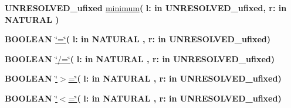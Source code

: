 \begin{DoxyCompactItemize}
\item 
{\bfseries {\bfseries \textcolor{vhdlchar}{U\+N\+R\+E\+S\+O\+L\+V\+E\+D\+\_\+ufixed}\textcolor{vhdlchar}{ }}} \hyperlink{class__fixed__pkg_ae6f8be7af801cf9cb3dcc7b877059955}{minimum}{\bfseries  ( }{\bfseries \textcolor{vhdlchar}{l\+: }\textcolor{stringliteral}{in }\textcolor{vhdlchar}{U\+N\+R\+E\+S\+O\+L\+V\+E\+D\+\_\+ufixed}}{\bfseries  , \textcolor{vhdlchar}{r\+: }\textcolor{stringliteral}{in }{\bfseries \textcolor{comment}{N\+A\+T\+U\+R\+A\+L}\textcolor{vhdlchar}{ }}}{\bfseries  )} 
\item 
{\bfseries {\bfseries \textcolor{comment}{B\+O\+O\+L\+E\+A\+N}\textcolor{vhdlchar}{ }}} \hyperlink{class__fixed__pkg_a7949e9258ea0749e3b35961feea8db87}{\char`\"{}=\char`\"{}}{\bfseries  ( }{\bfseries \textcolor{vhdlchar}{l\+: }\textcolor{stringliteral}{in }{\bfseries \textcolor{comment}{N\+A\+T\+U\+R\+A\+L}\textcolor{vhdlchar}{ }}}{\bfseries  , \textcolor{vhdlchar}{r\+: }\textcolor{stringliteral}{in }\textcolor{vhdlchar}{U\+N\+R\+E\+S\+O\+L\+V\+E\+D\+\_\+ufixed}}{\bfseries  )} 
\item 
{\bfseries {\bfseries \textcolor{comment}{B\+O\+O\+L\+E\+A\+N}\textcolor{vhdlchar}{ }}} \hyperlink{class__fixed__pkg_a00087aded97b434060226b9ba63a9077}{\char`\"{}/=\char`\"{}}{\bfseries  ( }{\bfseries \textcolor{vhdlchar}{l\+: }\textcolor{stringliteral}{in }{\bfseries \textcolor{comment}{N\+A\+T\+U\+R\+A\+L}\textcolor{vhdlchar}{ }}}{\bfseries  , \textcolor{vhdlchar}{r\+: }\textcolor{stringliteral}{in }\textcolor{vhdlchar}{U\+N\+R\+E\+S\+O\+L\+V\+E\+D\+\_\+ufixed}}{\bfseries  )} 
\item 
{\bfseries {\bfseries \textcolor{comment}{B\+O\+O\+L\+E\+A\+N}\textcolor{vhdlchar}{ }}} \hyperlink{class__fixed__pkg_a4cd07e388cdbb3996dd11f56781d3758}{\char`\"{}$>$=\char`\"{}}{\bfseries  ( }{\bfseries \textcolor{vhdlchar}{l\+: }\textcolor{stringliteral}{in }{\bfseries \textcolor{comment}{N\+A\+T\+U\+R\+A\+L}\textcolor{vhdlchar}{ }}}{\bfseries  , \textcolor{vhdlchar}{r\+: }\textcolor{stringliteral}{in }\textcolor{vhdlchar}{U\+N\+R\+E\+S\+O\+L\+V\+E\+D\+\_\+ufixed}}{\bfseries  )} 
\item 
{\bfseries {\bfseries \textcolor{comment}{B\+O\+O\+L\+E\+A\+N}\textcolor{vhdlchar}{ }}} \hyperlink{class__fixed__pkg_a65b73a94d4fe541a941f431175b342b7}{\char`\"{}$<$=\char`\"{}}{\bfseries  ( }{\bfseries \textcolor{vhdlchar}{l\+: }\textcolor{stringliteral}{in }{\bfseries \textcolor{comment}{N\+A\+T\+U\+R\+A\+L}\textcolor{vhdlchar}{ }}}{\bfseries  , \textcolor{vhdlchar}{r\+: }\textcolor{stringliteral}{in }\textcolor{vhdlchar}{U\+N\+R\+E\+S\+O\+L\+V\+E\+D\+\_\+ufixed}}{\bfseries  )} 

\end{DoxyCompactItemize}
